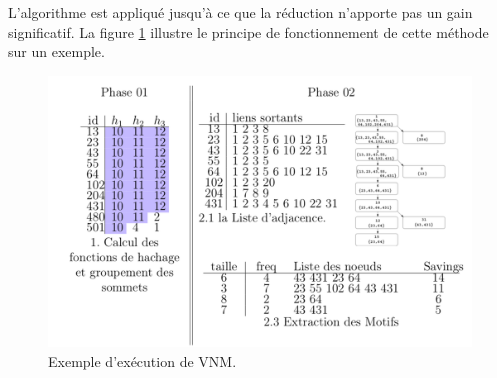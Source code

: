 				L'algorithme est appliqué jusqu'à ce que la réduction n'apporte pas un gain significatif. La figure \ref{VNM_exemple} illustre le principe de fonctionnement de cette méthode sur un exemple.
				
				
		
		
			\begin{figure}[!h]
			\centering
			\includegraphics[scale=0.3,center]{./ressources/image/VNM_exemple.png}
			\caption[Exemple d'exécution de VNM .]{Exemple d'exécution de VNM.}
			\label{VNM_exemple}
	\end{figure}